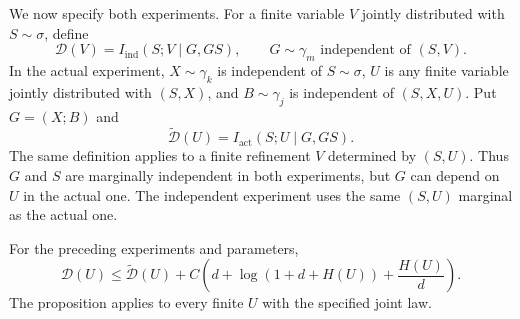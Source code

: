 We now specify both experiments.  For a finite variable \(V\)
jointly distributed with \(S\sim\sigma\), define
\[
 \mathcal D(V)=I_{\mathrm{ind}}(S;V\mid G,GS),
 \qquad G\sim\gamma_m
 \text{ independent of }(S,V).
\]
In the actual experiment, \(X\sim\gamma_k\) is independent of
\(S\sim\sigma\), \(U\) is any finite variable jointly distributed
with \((S,X)\), and \(B\sim\gamma_j\) is independent of
\((S,X,U)\).  Put \(G=(X;B)\) and
\[
 \widetilde{\mathcal D}(U)=I_{\mathrm{act}}(S;U\mid G,GS).
\]
The same definition applies to a finite refinement \(V\) determined
by \((S,U)\).
Thus \(G\) and \(S\) are marginally independent in both experiments,
but \(G\) can depend on \(U\) in the actual one.  The independent
experiment uses the same \((S,U)\) marginal as the actual one.

\begin{proposition}
\label{rlevels:one-comparison}
For the preceding experiments and parameters,
\begin{equation}\label{rlevels:one-comparison-bound}
 \mathcal D(U)\le\widetilde{\mathcal D}(U)
 +C\left(d+\log(1+d+H(U))+\frac{H(U)}d\right).
\end{equation}
The proposition applies to every finite \(U\) with the specified
joint law.
\end{proposition}

